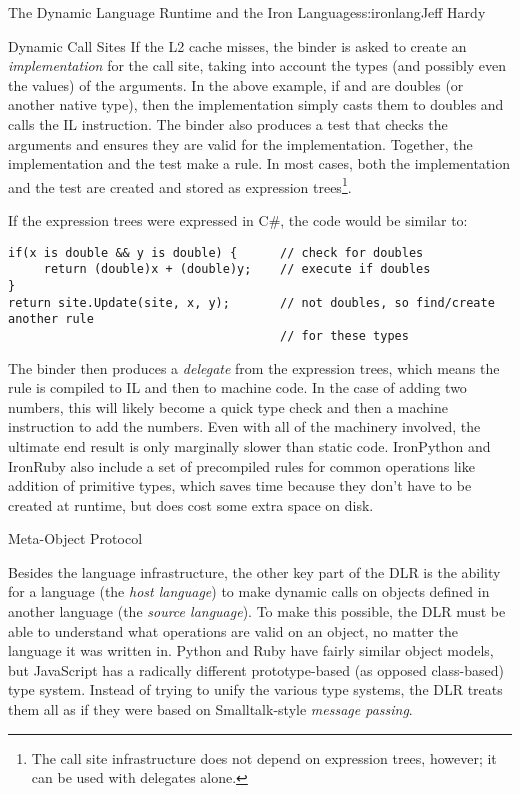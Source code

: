 \begin{aosachapter}{The Dynamic Language Runtime and the Iron Languages}{s:ironlang}{Jeff Hardy}
\begin{aosasect1}{Dynamic Call Sites}
If the L2 cache misses, the binder is asked to create an \emph{implementation}
for the call site, taking into account the types (and possibly even the values)
of the arguments. In the above example, if  and  are doubles
(or another native type), then the implementation simply casts them to doubles
and calls the IL  instruction. The binder also produces a test that
checks the arguments and ensures they are valid for the implementation.
Together, the implementation and the test make a rule. In most cases, both the
implementation and the test are created and stored as expression
trees\footnote{The call site infrastructure does not depend on expression
trees, however; it can be used with delegates alone.}.

\newpage %

\noindent If the expression trees were expressed in C\#, the code would be similar to:

\begin{verbatim}
if(x is double && y is double) {      // check for doubles
     return (double)x + (double)y;    // execute if doubles
}
return site.Update(site, x, y);       // not doubles, so find/create another rule
                                      // for these types
\end{verbatim}

The binder then produces a \emph{delegate} from the expression trees, which
means the rule is compiled to IL and then to machine code. In the case of
adding two numbers, this will likely become a quick type check and then a
machine instruction to add the numbers. Even with all of the machinery
involved, the ultimate end result is only marginally slower than static code.
IronPython and IronRuby also include a set of precompiled rules for common
operations like addition of primitive types, which saves time because they don't
have to be created at runtime, but does cost some extra space on disk.

\end{aosasect1}

\begin{aosasect1}{Meta-Object Protocol}

Besides the language infrastructure, the other key part of the DLR is the
ability for a language (the \emph{host language}) to make dynamic calls on
objects defined in another language (the \emph{source language}). To make this
possible, the DLR must be able to understand what operations are valid on an
object, no matter the language it was written in. Python and Ruby have fairly
similar object models, but JavaScript has a radically different prototype-based
(as opposed class-based) type system. Instead of trying to unify the various
type systems, the DLR treats them all as if they were based on Smalltalk-style
\emph{message passing}.


\end{aosasect1}
\end{aosachapter}
